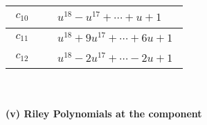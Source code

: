 \documentclass[1p]{elsarticle_modified}
\theoremstyle{definition}
\begin{document}
\begin{tabular}{m{50pt}|m{274pt}}
\hline $$\begin{aligned}c_{10}\end{aligned}$$&$\begin{aligned}
&u^{18}- u^{17}+\cdots+u+1
\end{aligned}$\\
\hline $$\begin{aligned}c_{11}\end{aligned}$$&$\begin{aligned}
&u^{18}+9 u^{17}+\cdots+6 u+1
\end{aligned}$\\
\hline $$\begin{aligned}c_{12}\end{aligned}$$&$\begin{aligned}
&u^{18}-2 u^{17}+\cdots-2 u+1
\end{aligned}$\\
\hline
\end{tabular}\\~\\
\newpage\renewcommand{\arraystretch}{1}
\flushleft \textbf{(v) Riley Polynomials at the component}\newline \\
\end{document}
